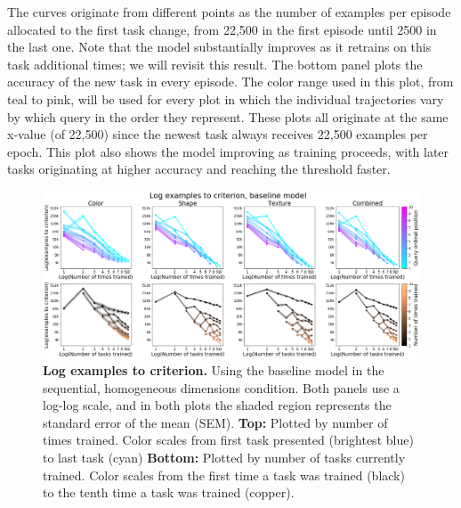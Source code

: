 The curves originate from different points as the number of examples per episode allocated to the first task change, from 22,500 in the first episode until 2500 in the last one. Note that the model substantially improves as it retrains on this task additional times; we will revisit this result. The bottom panel plots the accuracy of the new task in every episode. The color range used in this plot, from teal to pink, will be used for every plot in which the individual trajectories vary by which query in the order they represent. These plots all originate at the same x-value (of 22,500) since the newest task always receives 22,500 examples per epoch. This plot also shows the model improving as training proceeds, with later tasks originating at higher accuracy and reaching the threshold faster.

\begin{figure}[!htb]
\centering
\includegraphics[width=\linewidth]{ch-results/figures/baseline_sequential/examples_to_criterion.png}
\caption{ {\bf Log examples to criterion.} Using the baseline model in the sequential, homogeneous dimensions condition. Both panels use a log-log scale, and in both plots the shaded region represents the standard error of the mean (SEM). \textbf{Top:} Plotted by number of times trained. Color scales from first task presented (brightest blue) to last task (cyan) \textbf{Bottom:} Plotted by number of tasks currently trained. Color scales from the first time a task was trained (black) to the tenth time a task was trained (copper).}
\label{fig:results-baseline-sequential-examples-to-criterion}
\end{figure}

